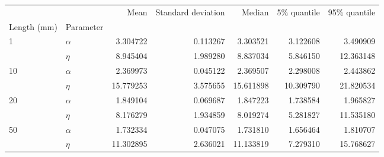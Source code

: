 \begin{tabular}{llrrrrr}
\toprule
   &        &       Mean &  Standard deviation &     Median &  5\% quantile &  95\% quantile \\
Length (mm) & Parameter &            &                     &            &              &               \\
\midrule
1  & $\alpha$ &   3.304722 &            0.113267 &   3.303521 &     3.122608 &      3.490909 \\
   & $\eta$ &   8.945404 &            1.989280 &   8.837034 &     5.846150 &     12.363148 \\
10 & $\alpha$ &   2.369973 &            0.045122 &   2.369507 &     2.298008 &      2.443862 \\
   & $\eta$ &  15.779253 &            3.575655 &  15.611898 &    10.309790 &     21.820534 \\
20 & $\alpha$ &   1.849104 &            0.069687 &   1.847223 &     1.738584 &      1.965827 \\
   & $\eta$ &   8.176279 &            1.934859 &   8.019274 &     5.281827 &     11.535180 \\
50 & $\alpha$ &   1.732334 &            0.047075 &   1.731810 &     1.656464 &      1.810707 \\
   & $\eta$ &  11.302895 &            2.636021 &  11.133819 &     7.279310 &     15.768627 \\
\bottomrule
\end{tabular}
